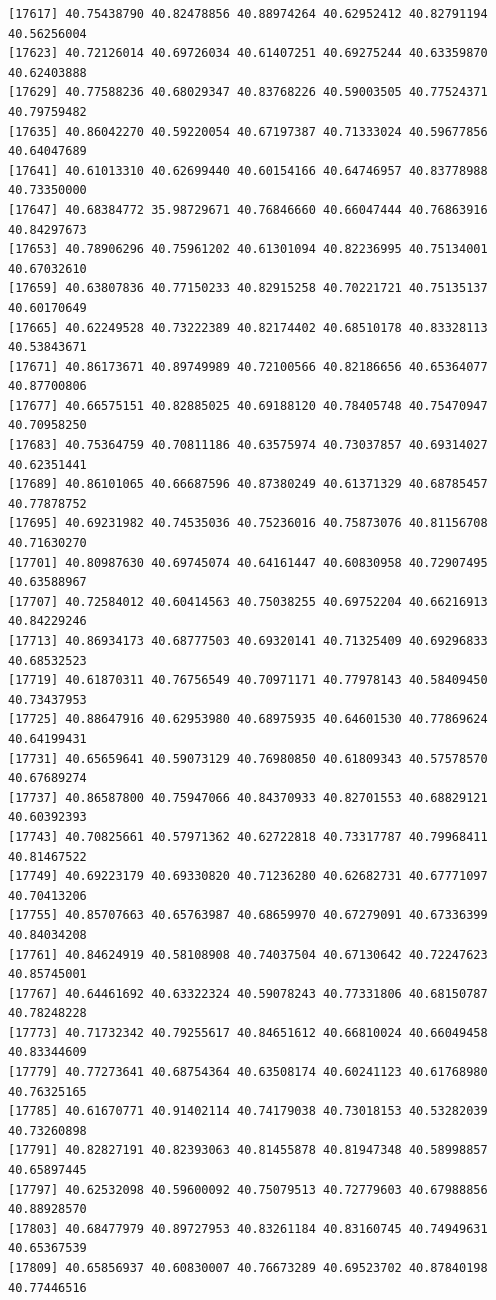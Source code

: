 \documentclass[
  letterpaper,
  DIV=11,
  numbers=noendperiod]{scrartcl}
\begin{document}
\begin{verbatim}
[17617] 40.75438790 40.82478856 40.88974264 40.62952412 40.82791194 40.56256004
[17623] 40.72126014 40.69726034 40.61407251 40.69275244 40.63359870 40.62403888
[17629] 40.77588236 40.68029347 40.83768226 40.59003505 40.77524371 40.79759482
[17635] 40.86042270 40.59220054 40.67197387 40.71333024 40.59677856 40.64047689
[17641] 40.61013310 40.62699440 40.60154166 40.64746957 40.83778988 40.73350000
[17647] 40.68384772 35.98729671 40.76846660 40.66047444 40.76863916 40.84297673
[17653] 40.78906296 40.75961202 40.61301094 40.82236995 40.75134001 40.67032610
[17659] 40.63807836 40.77150233 40.82915258 40.70221721 40.75135137 40.60170649
[17665] 40.62249528 40.73222389 40.82174402 40.68510178 40.83328113 40.53843671
[17671] 40.86173671 40.89749989 40.72100566 40.82186656 40.65364077 40.87700806
[17677] 40.66575151 40.82885025 40.69188120 40.78405748 40.75470947 40.70958250
[17683] 40.75364759 40.70811186 40.63575974 40.73037857 40.69314027 40.62351441
[17689] 40.86101065 40.66687596 40.87380249 40.61371329 40.68785457 40.77878752
[17695] 40.69231982 40.74535036 40.75236016 40.75873076 40.81156708 40.71630270
[17701] 40.80987630 40.69745074 40.64161447 40.60830958 40.72907495 40.63588967
[17707] 40.72584012 40.60414563 40.75038255 40.69752204 40.66216913 40.84229246
[17713] 40.86934173 40.68777503 40.69320141 40.71325409 40.69296833 40.68532523
[17719] 40.61870311 40.76756549 40.70971171 40.77978143 40.58409450 40.73437953
[17725] 40.88647916 40.62953980 40.68975935 40.64601530 40.77869624 40.64199431
[17731] 40.65659641 40.59073129 40.76980850 40.61809343 40.57578570 40.67689274
[17737] 40.86587800 40.75947066 40.84370933 40.82701553 40.68829121 40.60392393
[17743] 40.70825661 40.57971362 40.62722818 40.73317787 40.79968411 40.81467522
[17749] 40.69223179 40.69330820 40.71236280 40.62682731 40.67771097 40.70413206
[17755] 40.85707663 40.65763987 40.68659970 40.67279091 40.67336399 40.84034208
[17761] 40.84624919 40.58108908 40.74037504 40.67130642 40.72247623 40.85745001
[17767] 40.64461692 40.63322324 40.59078243 40.77331806 40.68150787 40.78248228
[17773] 40.71732342 40.79255617 40.84651612 40.66810024 40.66049458 40.83344609
[17779] 40.77273641 40.68754364 40.63508174 40.60241123 40.61768980 40.76325165
[17785] 40.61670771 40.91402114 40.74179038 40.73018153 40.53282039 40.73260898
[17791] 40.82827191 40.82393063 40.81455878 40.81947348 40.58998857 40.65897445
[17797] 40.62532098 40.59600092 40.75079513 40.72779603 40.67988856 40.88928570
[17803] 40.68477979 40.89727953 40.83261184 40.83160745 40.74949631 40.65367539
[17809] 40.65856937 40.60830007 40.76673289 40.69523702 40.87840198 40.77446516

\end{verbatim}
\end{document}

